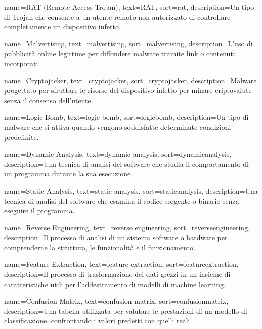  {
    name={RAT (Remote Access Trojan)},
    text={RAT},
    sort={rat},
    description={Un tipo di Trojan che consente a un utente remoto non autorizzato di controllare completamente un dispositivo infetto.}
}

 {
    name={Malvertising},
    text={malvertising},
    sort={malvertising},
    description={L'uso di pubblicità online legittime per diffondere malware tramite link o contenuti incorporati.}
}

 {
    name={Cryptojacker},
    text={cryptojacker},
    sort={cryptojacker},
    description={Malware progettato per sfruttare le risorse del dispositivo infetto per minare criptovalute senza il consenso dell'utente.}
}

 {
    name={Logic Bomb},
    text={logic bomb},
    sort={logicbomb},
    description={Un tipo di malware che si attiva quando vengono soddisfatte determinate condizioni predefinite.}
}

 {
    name={Dynamic Analysis},
    text={dynamic analysis},
    sort={dynamicanalysis},
    description={Una tecnica di analisi del software che studia il comportamento di un programma durante la sua esecuzione.}
}

 {
    name={Static Analysis},
    text={static analysis},
    sort={staticanalysis},
    description={Una tecnica di analisi del software che esamina il codice sorgente o binario senza eseguire il programma.}
}

 {
    name={Reverse Engineering},
    text={reverse engineering},
    sort={reverseengineering},
    description={Il processo di analisi di un sistema software o hardware per comprenderne la struttura, le funzionalità e il funzionamento.}
}

 {
    name={Feature Extraction},
    text={feature extraction},
    sort={featureextraction},
    description={Il processo di trasformazione dei dati grezzi in un insieme di caratteristiche utili per l'addestramento di modelli di machine learning.}
}

 {
    name={Confusion Matrix},
    text={confusion matrix},
    sort={confusionmatrix},
    description={Una tabella utilizzata per valutare le prestazioni di un modello di classificazione, confrontando i valori predetti con quelli reali.}
}

